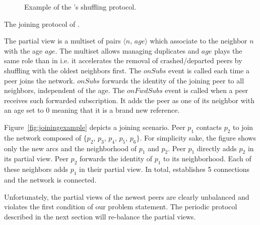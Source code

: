 \begin{figure*}
  \centering
  \hspace{10pt}
  \hspace{10pt}
  \caption{\label{fig:cyclicexample}Example of the \SPRAY's shuffling
    protocol. }
\end{figure*}

\begin{algorithm}

\caption{\label{algo:joining}The joining protocol of \SPRAY.}
\end{algorithm}

The partial view is a multiset of pairs $\langle n,\, age\rangle$ which
associate to the neighbor $n$ with the age $age$. The multiset allows managing
duplicates and $age$ plays the same role than in \CYCLON i.e.  it accelerates
the removal of crashed/departed peers by shuffling with the oldest neighbors
first. The $onSubs$ event is called each time a peer joins the
network. $onSubs$ forwards the identity of the joining peer to all neighbors,
independent of the age. The $onFwdSubs$ event is called when a peer receives
such forwarded subscription. It adds the peer as one of its neighbor with an
age set to $0$ meaning that it is a brand new reference.

Figure~\ref{fig:joiningexample} depicts a joining scenario.
Peer $p_1$ contacts $p_2$ to join the network composed of $\{p_2$, $p_3$,
$p_4$, $p_5$, $p_6\}$. For simplicity sake, the figure shows only the new arcs
and the neighborhood of $p_1$ and $p_2$. Peer $p_1$ directly adds $p_2$ in its
partial view. Peer $p_2$ forwards the identity of $p_1$ to its
neighborhood. Each of these neighbors adds $p_1$ in their partial view. In
total, \SPRAY establishes 5 connections and the network is connected.

Unfortunately, the partial views of the newest peers are clearly unbalanced and
violates the first condition of our problem statement. The periodic protocol
described in the next section will re-balance the partial views.

